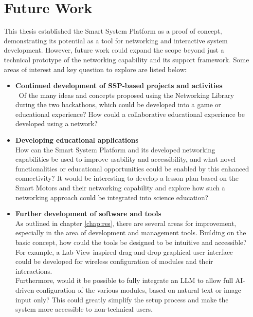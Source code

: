 \cleardoublepage%
\chapter{\label{chap:fut}Future Work}%

This thesis established the Smart System Platform as a proof of concept, demonstrating its potential as a tool for networking and interactive system development. However, future work could expand the scope beyond just a technical prototype of the networking capability and its support framework. Some areas of interest and key question to explore are listed below:

\begin{itemize}
    \item \textbf{Continued development of SSP-based projects and activities}\\\
    Of the many ideas and concepts proposed using the Networking Library during the two hackathons, which could be developed into a game or educational experience? How could a collaborative educational experience be developed using a network? 
    
    \item \textbf{Developing educational applications}\\
    How can the Smart System Platform and its developed networking capabilities be used to improve usability and accessibility, and what novel functionalities or educational opportunities could be enabled by this enhanced connectivity? It would be interesting to develop a lesson plan based on the Smart Motors and their networking capability and explore how such a networking approach could be integrated into science education?
    
    \item \textbf{Further development of software and tools}\\
    As outlined in chapter \ref{chap:res}, there are several areas for improvement, especially in the area of development and management tools. Building on the basic concept, how could the tools be designed to be intuitive and accessible? For example, a Lab-View inspired drag-and-drop graphical user interface could be developed for wireless configuration of modules and their interactions. \\
    Furthermore, would it be possible to fully integrate an LLM to allow full AI-driven configuration of the various modules, based on natural text or image input only? This could greatly simplify the setup process and make the system more accessible to non-technical users. 


\end{itemize}
